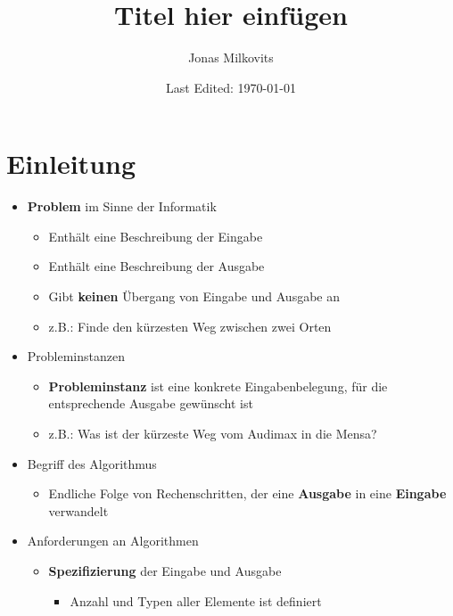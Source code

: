 

\begin{titlepage}
  \title{Titel hier einfügen} %
  \author{Jonas Milkovits}
  \date{Last Edited: \today}
\end{titlepage}



\maketitle
{} %
\tableofcontents
\clearpage
{} %


\section{Einleitung}
\begin{itemize}
  \item \textbf{Problem} im Sinne der Informatik
    \begin{itemize}
      \item Enthält eine Beschreibung der Eingabe 
      \item Enthält eine Beschreibung der Ausgabe
      \item Gibt \textbf{keinen} Übergang von Eingabe und Ausgabe an
      \item z.B.: Finde den kürzesten Weg zwischen zwei Orten
    \end{itemize}
  \item Probleminstanzen
    \begin{itemize}
      \item \textbf{Probleminstanz} ist eine konkrete Eingabenbelegung, für die entsprechende Ausgabe gewünscht ist
      \item z.B.: Was ist der kürzeste Weg vom Audimax in die Mensa?
    \end{itemize}
  \item Begriff des Algorithmus
    \begin{itemize}
      \item Endliche Folge von Rechenschritten, der eine \textbf{Ausgabe} in eine \textbf{Eingabe} verwandelt 
    \end{itemize}
  \item Anforderungen an Algorithmen
    \begin{itemize}
      \item \textbf{Spezifizierung} der Eingabe und Ausgabe 
        \begin{itemize}
          \item Anzahl und Typen aller Elemente ist definiert

        \end{itemize}
    \end{itemize}
  

\end{itemize}





